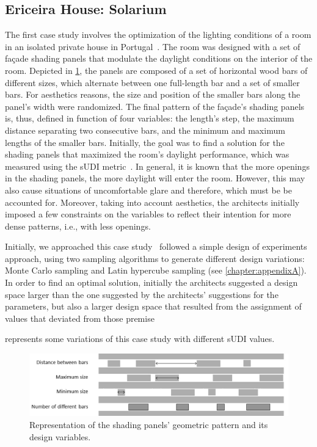\subsection{Ericeira House: Solarium}
The first case study involves the optimization of the lighting conditions of a room in an isolated private house in Portugal~\cite{Caetano2018,Belem2018optimizeddesign}. The room was designed with a set of façade shading panels that modulate the daylight conditions on the interior of the room. Depicted in \cref{fig:ericeira_panels_explanation}, the panels are composed of a set of horizontal wood bars of different sizes, which alternate between one full-length bar and a set of smaller bars. For aesthetics reasons, the size and position of the smaller bars along the panel's width were randomized. The final pattern of the façade's shading panels is, thus, defined in function of four variables: the length’s step, the maximum distance separating two consecutive bars, and the minimum and maximum lengths of the smaller bars. Initially, the goal was to find a solution for the shading panels that maximized the room's daylight performance, which was measured using the \ac{sUDI} metric~\cite{Nabil2006}. In general, it is known that the more openings in the shading panels, the more daylight will enter the room. However, this may also cause situations of uncomfortable glare and therefore, which must be be accounted for. Moreover, taking into account aesthetics, the architects initially imposed a few constraints on the variables to reflect their intention for more dense patterns, i.e., with less openings. 

Initially, we approached this case study~\cite{Caetano2018} followed a simple design of experiments approach, using two sampling algorithms to generate different design variations: Monte Carlo sampling and Latin hypercube sampling (see \cref{chapter:appendixA}). In order to find an optimal solution, initially the architects suggested  a design space larger than the one suggested by the architects’ suggestions for the parameters, but also a larger design space that resulted from the assignment of values that deviated from those premise

 represents some variations of this case study with different \ac{sUDI} values.
\begin{figure}[htbp]
	\centering
	\includegraphics[width=\textwidth]{Images/Evaluation/Ericeira_1.jpg}
	\caption{Representation of the shading panels' geometric pattern and its design variables.}
	\label{fig:ericeira_panels_explanation}
\end{figure}

